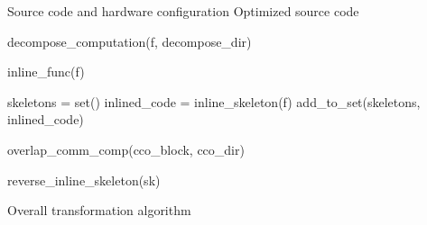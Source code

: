%
%
%
%
%
%
%

\begin{algorithm}
{\scriptsize
\begin{algorithmic}
\Require Source code and hardware configuration
\Ensure Optimized source code

    \State decompose\_computation(f, decompose\_dir)
  \EndFor

    \State inline\_func(f)
  \EndFor

  \State skeletons = set()
    \State inlined\_code = inline\_skeleton(f)
    \State add\_to\_set(skeletons, inlined\_code)
  \EndFor

  \State overlap\_comm\_comp(cco\_block, cco\_dir)

    \State reverse\_inline\_skeleton(sk)
  \EndFor
\EndFor

\end{algorithmic}
\caption{Overall transformation algorithm}
\label{alg:workflow}
}%
\end{algorithm}

